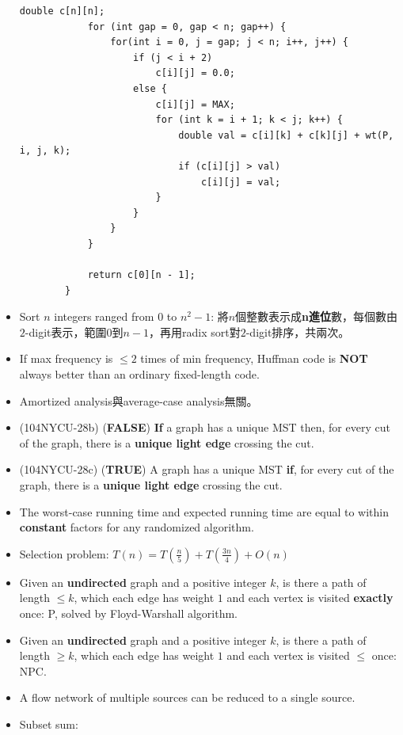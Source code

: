 \begin{itemize}
\begin{lstlisting}[caption={Minimum triangulation.}, captionpos=b]
            double c[n][n];
            for (int gap = 0, gap < n; gap++) {
                for(int i = 0, j = gap; j < n; i++, j++) {
                    if (j < i + 2)
                        c[i][j] = 0.0;
                    else {
                        c[i][j] = MAX;
                        for (int k = i + 1; k < j; k++) {
                            double val = c[i][k] + c[k][j] + wt(P, i, j, k);
                            if (c[i][j] > val)
                                c[i][j] = val;
                        }
                    }
                }
            }

            return c[0][n - 1];
        }
    \end{lstlisting}
    \item Sort $n$ integers ranged from $0$ to $n^2 - 1$: 將$n$個整數表示成\textbf{n進位}數，每個數由$2$-digit表示，範圍$0$到$n - 1$，再用radix sort對$2$-digit排序，共兩次。
    \item If max frequency is $\le 2$ times of min frequency, Huffman code is \textbf{NOT} always better than an ordinary fixed-length code.
    \item Amortized analysis與average-case analysis無關。
    \item (104NYCU-28b) (\textbf{FALSE}) \textbf{If} a graph has a unique MST then, for every cut of the graph, there is a \textbf{unique light edge} crossing the cut.
    \item (104NYCU-28c) (\textbf{TRUE}) A graph has a unique MST \textbf{if}, for every cut of the graph, there is a \textbf{unique light edge} crossing the cut.
    \item The worst-case running time and expected running time are equal to within \textbf{constant} factors for any randomized algorithm.
    \item Selection problem: $T(n) = T(\frac{n}{5}) + T(\frac{3n}{4}) + O(n)$
    \item Given an \textbf{undirected} graph and a positive integer $k$, is there a path of length $\le k$, which each edge has weight $1$ and each vertex is visited \textbf{exactly} once: P, solved by Floyd-Warshall algorithm.
    \item Given an \textbf{undirected} graph and a positive integer $k$, is there a path of length $\ge k$, which each edge has weight $1$ and each vertex is visited $\le$ once: NPC.
    \item A flow network of multiple sources can be reduced to a single source.
    \item Subset sum: \\

\end{itemize}
